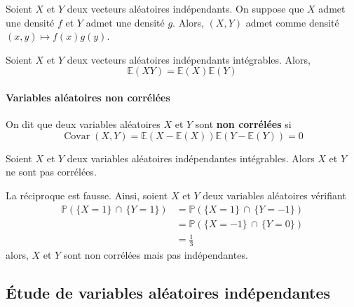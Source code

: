   \begin{proposition}
    Soient $X$ et $Y$ deux vecteurs aléatoires indépendants. On suppose que $X$ admet une densité $f$ et $Y$ admet une densité $g$. Alors, $(X,Y)$ admet comme densité $(x,y) \mapsto f(x)g(y)$.
  \end{proposition}


  \begin{proposition}
    Soient $X$ et $Y$ deux vecteurs aléatoires indépendants intégrables. Alors,
    \[ \mathbb{E}(XY) = \mathbb{E}(X) \mathbb{E}(Y) \]
  \end{proposition}

  \paragraph{Variables aléatoires non corrélées}


  \begin{definition}
    On dit que deux variables aléatoires $X$ et $Y$ sont \textbf{non corrélées} si
    \[ \operatorname{Covar}(X,Y) = \mathbb{E}(X - \mathbb{E}(X))\mathbb{E}(Y - \mathbb{E}(Y)) = 0 \]
  \end{definition}

  \begin{proposition}
    Soient $X$ et $Y$ deux variables aléatoires indépendantes intégrables. Alors $X$ et $Y$ ne sont pas corrélées.
  \end{proposition}

  \begin{cexample}
    La réciproque est fausse. Ainsi, soient $X$ et $Y$ deux variables aléatoires vérifiant
    \begin{align*}
      \mathbb{P}(\{ X = 1 \} \, \cap \, \{ Y = 1 \}) &= \mathbb{P}(\{ X = 1 \} \, \cap \, \{ Y = -1 \}) \\
      &= \mathbb{P}(\{ X = -1 \} \, \cap \, \{ Y = 0 \}) \\
      &= \frac{1}{3}
    \end{align*}
    alors, $X$ et $Y$ sont non corrélées mais pas indépendantes.
  \end{cexample}

  \subsection{Étude de variables aléatoires indépendantes}

